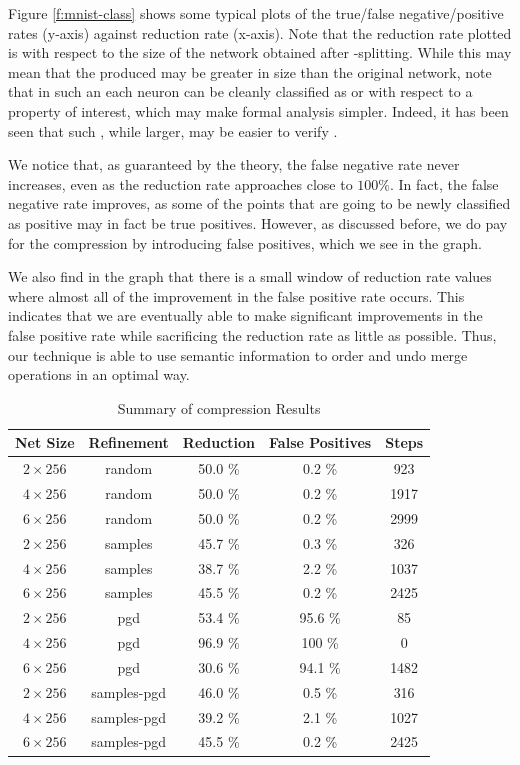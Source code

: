 Figure \ref{f:mnist-class} shows some typical plots of the true/false
negative/positive rates (y-axis) against reduction rate (x-axis). Note that the
reduction rate plotted is with respect to the size of the network obtained after
\inc-\dec splitting. While this may mean that the \abs produced may be greater in
size than the original network, note that in such an \abs each neuron can be
cleanly classified as \inc or \dec with respect to a property of interest, which
may make formal analysis simpler. Indeed, it has been seen that such \abs, while
larger, may be easier to verify \cite{cegar-nn}.

We notice that, as guaranteed by the theory, the false negative rate never
increases, even as the reduction rate approaches close to $100\%$. In fact, the
false negative rate improves, as some of the points that are going
to be newly classified as positive may in fact be true positives.  
However, as discussed before, we do pay for the compression by introducing false
positives, which we see in the graph. 

We also find in the graph that there is a
small window of reduction rate values where almost all of the improvement in the
false positive rate occurs. This indicates that we are eventually able to make 
significant improvements in the false positive rate while sacrificing the
reduction rate as little as possible. Thus, our technique is able to use
semantic information to order and undo merge operations in an optimal way.

\begin{table}
\begin{tabular}{|c|c|c|c|c|}
\hline
Net Size     & Refinement  & Reduction & False Positives & Steps  \\ 
\hline
$2\times256$ & random      & 50.0 \%   & 0.2  \%         &  923   \\  
$4\times256$ & random      & 50.0 \%   & 0.2  \%         & 1917    \\ 
$6\times256$ & random      & 50.0 \%   & 0.2  \%         & 2999    \\ 
$2\times256$ & samples     & 45.7 \%   & 0.3  \%         &  326    \\ 
$4\times256$ & samples     & 38.7 \%   & 2.2  \%         & 1037    \\ 
$6\times256$ & samples     & 45.5 \%   & 0.2  \%         & 2425    \\ 
$2\times256$ & pgd         & 53.4 \%   & 95.6 \%         &   85    \\ 
$4\times256$ & pgd         & 96.9 \%   & 100  \%         &    0    \\ 
$6\times256$ & pgd         & 30.6 \%   & 94.1 \%         & 1482    \\ 
$2\times256$ & samples-pgd & 46.0 \%   & 0.5  \%         &  316    \\ 
$4\times256$ & samples-pgd & 39.2 \%   & 2.1  \%         & 1027    \\ 
$6\times256$ & samples-pgd & 45.5 \%   & 0.2  \%         & 2425    \\ 
\hline
\end{tabular}
\caption{Summary of \mnist compression Results}
\label{t:mnist-compr-summary}
\end{table}

